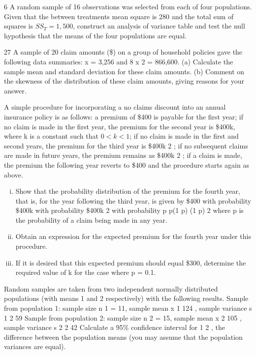 \documentclass[a4paper,12pt]{article}
\begin{document}
6
A random sample of 16 observations was selected from each of four populations. Given that the between treatments mean square is 280 and the total sum of squares is $SS_T = 1,500$, construct an analysis of variance table and test the null hypothesis that the means of the four populations are equal.

27
A sample of 20 claim amounts (\$) on a group of household policies gave the
following data summaries:
x = 3,256 and
8
x 2 = 866,600.
(a) Calculate the sample mean and standard deviation for these claim amounts.
(b) Comment on the skewness of the distribution of these claim amounts, giving reasons for your answer.

A simple procedure for incorporating a no claims discount into an annual insurance policy is as follows:
a premium of \$400 is payable for the first year;
if no claim is made in the first year, the premium for the second year is \$400k,
where k is a constant such that $0 < k < 1$;
if no claim is made in the first and second years, the premium for the third
year is \$400k 2 ;
if no subsequent claims are made in future years, the premium remains as
\$400k 2 ;
if a claim is made, the premium the following year reverts to \$400 and the
procedure starts again as above.

\begin{enumerate}[(i)]
\item
Show that the probability distribution of the premium for the fourth year, that
is, for the year following the third year, is given by
\$400
with probability
\$400k with probability
\$400k 2 with probability
p
p(1 p)
(1 p) 2
where p is the probability of a claim being made in any year.

\item  Obtain an expression for the expected premium for the fourth year under this
procedure.

\item If it is desired that this expected premium should equal \$300, determine the
required value of k for the case where p = 0.1.
\end{enumerate}

Random samples are taken from two independent normally distributed populations
(with means 1 and 2 respectively) with the following results.
Sample from population 1:
sample size n 1 = 11, sample mean x 1 124 , sample variance s 1 2
59
Sample from population 2:
sample size n 2 = 15, sample mean x 2 105 , sample variance s 2 2
42
Calculate a 95\% confidence interval for 1
2 , the difference between the
population means (you may assume that the population variances are equal).
\newpage
\end{document}
